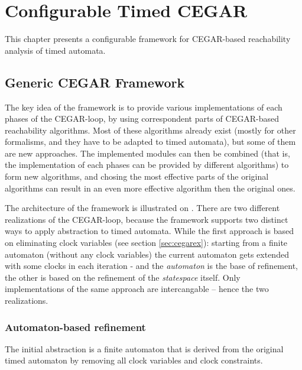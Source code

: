 \chapter{Configurable Timed CEGAR} \label{chap:timed_cegar}

This chapter presents a configurable framework for CEGAR-based reachability analysis of timed automata. 

\section{Generic CEGAR Framework}

The key idea of the framework is to provide various implementations of each phases of the CEGAR-loop, by using correspondent parts of CEGAR-based reachability algorithms. Most of these algorithms already exist (mostly for other formalisms, and they have to be adapted to timed automata), but some of them are new approaches. The implemented modules can then be combined (that is, the implementation of each phases can be provided by different algorithms) to form new algorithms, and chosing the most effective parts of the original algorithms can result in an even more effective algorithm then the original ones. 


The architecture of the framework is illustrated on . There are two different realizations of the CEGAR-loop, because the framework supports two distinct ways to apply abstraction to timed automata. While the first approach  is based on eliminating clock variables (see section \ref{sec:cegarex}):  starting from a finite automaton (without any clock variables) the current automaton gets extended with some clocks in each iteration - and the \emph{automaton} is the base of refinement, the other  is based on the refinement of the \emph{statespace} itself. Only implementations of the same approach are intercangable -- hence the two realizations.

\subsection{Automaton-based refinement}

 The initial abstraction is a finite automaton that is derived from the original timed automaton by removing all clock variables and clock constraints. 

